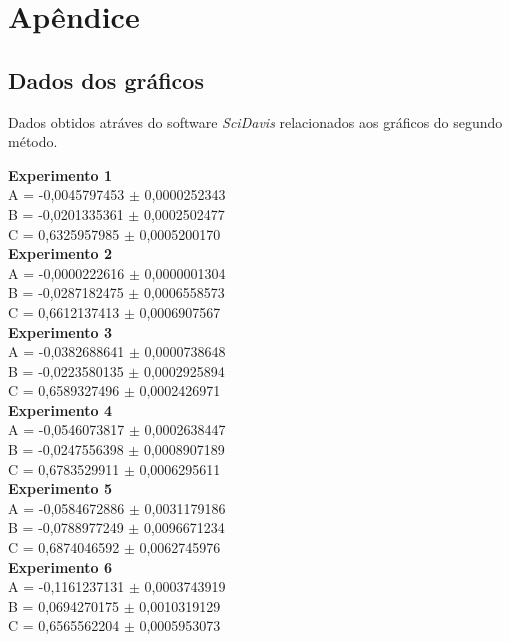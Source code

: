 \documentclass[a4papper, 10pt]{article}
\begin{document}
\section{Apêndice}
\vspace{0.10 cm}
\small
\begin{table}[H]

\subsection{Dados dos gráficos}

Dados obtidos atráves do software \textit{SciDavis} relacionados aos gráficos do segundo método.

\textbf{Experimento 1}\\
A = -0,0045797453 $\pm$ 0,0000252343 \\
B = -0,0201335361 $\pm$ 0,0002502477 \\
C = 0,6325957985 $\pm$ 0,0005200170 \\


\textbf{Experimento 2}\\
A = -0,0000222616 $\pm$ 0,0000001304 \\
B = -0,0287182475 $\pm$ 0,0006558573 \\
C = 0,6612137413 $\pm$ 0,0006907567 \\


\textbf{Experimento 3}\\
A = -0,0382688641 $\pm$ 0,0000738648 \\
B = -0,0223580135 $\pm$ 0,0002925894 \\
C = 0,6589327496 $\pm$ 0,0002426971 \\

\textbf{Experimento 4}\\
A = -0,0546073817 $\pm$ 0,0002638447 \\
B = -0,0247556398 $\pm$ 0,0008907189 \\
C = 0,6783529911 $\pm$ 0,0006295611 \\

\textbf{Experimento 5}\\
A = -0,0584672886 $\pm$ 0,0031179186 \\
B = -0,0788977249 $\pm$ 0,0096671234 \\
C = 0,6874046592 $\pm$ 0,0062745976 \\


\textbf{Experimento 6}\\
A = -0,1161237131 $\pm$ 0,0003743919 \\
B = 0,0694270175 $\pm$ 0,0010319129 \\
C = 0,6565562204 $\pm$ 0,0005953073 \\



\end{table}
\end{document}
